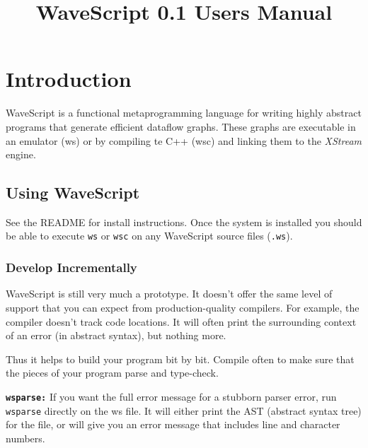 


\title{WaveScript 0.1 Users Manual}

\newcommand{\rednote}[1]{{\em \bf{}}}







\maketitle


\tableofcontents
\clearpage

\chapter{Introduction}

WaveScript is a functional metaprogramming language for writing highly abstract
programs that generate efficient dataflow graphs.  These graphs are
executable in an emulator (ws) or by compiling te C++ (wsc) and linking them
to the {\em XStream} engine.

\section{Using WaveScript}

See the README for install instructions.  Once the system is installed
you should be able to execute {\tt ws} or {\tt wsc} on any WaveScript
source files ({\tt .ws}).

\subsection*{Develop Incrementally}

WaveScript is still very much a prototype.  It doesn't offer the same
level of support that you can expect from production-quality
compilers.  For example, the compiler doesn't track code locations.
It will often print the surrounding context of an error (in abstract
syntax), but nothing more.

Thus it helps to build your program bit by bit.  Compile often to make
sure that the pieces of your program parse and type-check.

{\tt \bf wsparse:}
If you want the full error message for a stubborn parser error, run
{\tt wsparse} directly on the ws file.  It will either print the AST
(abstract syntax tree) for the file, or will give you an error message
that includes line and character numbers.


